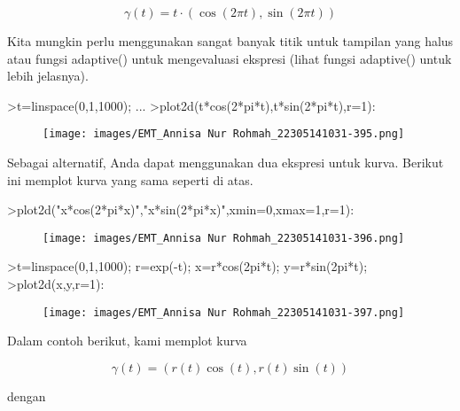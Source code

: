 \documentclass[a4paper,10pt]{article}
\begin{document}
\begin{eulernotebook}
\begin{eulercomment}
\end{eulercomment}
\begin{eulerformula}
\[
\gamma(t) = t \cdot (\cos(2\pi t),\sin(2\pi t))
\]
\end{eulerformula}
\begin{eulercomment}
Kita mungkin perlu menggunakan sangat banyak titik untuk tampilan yang
halus atau fungsi adaptive() untuk mengevaluasi ekspresi (lihat fungsi
adaptive() untuk lebih jelasnya).
\end{eulercomment}
\begin{eulerprompt}
>t=linspace(0,1,1000); ...
>plot2d(t*cos(2*pi*t),t*sin(2*pi*t),r=1):
\end{eulerprompt}
\begin{figure}[h]
    \centering
    \texttt{[image: images/EMT\_Annisa Nur Rohmah\_22305141031-395.png]}
\end{figure}
\begin{eulercomment}
Sebagai alternatif, Anda dapat menggunakan dua ekspresi untuk kurva.
Berikut ini memplot kurva yang sama seperti di atas.
\end{eulercomment}
\begin{eulerprompt}
>plot2d("x*cos(2*pi*x)","x*sin(2*pi*x)",xmin=0,xmax=1,r=1):
\end{eulerprompt}
\begin{figure}[h]
    \centering
    \texttt{[image: images/EMT\_Annisa Nur Rohmah\_22305141031-396.png]}
\end{figure}
\begin{eulerprompt}
>t=linspace(0,1,1000); r=exp(-t); x=r*cos(2pi*t); y=r*sin(2pi*t);
>plot2d(x,y,r=1):
\end{eulerprompt}
\begin{figure}[h]
    \centering
    \texttt{[image: images/EMT\_Annisa Nur Rohmah\_22305141031-397.png]}
\end{figure}
\begin{eulercomment}
Dalam contoh berikut, kami memplot kurva

\end{eulercomment}
\begin{eulerformula}
\[
\gamma(t) = (r(t) \cos(t), r(t) \sin(t))
\]
\end{eulerformula}
\begin{eulercomment}
dengan


\end{eulercomment}
\end{eulernotebook}
\end{document}
